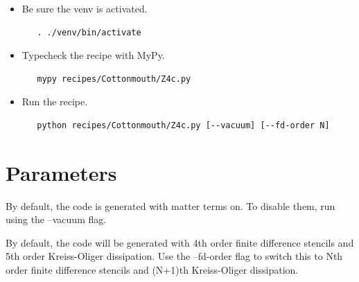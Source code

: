 \documentclass{article}
\begin{document}
\begin{itemize}
\item Be sure the venv is activated.
   \begin{verbatim}
   . ./venv/bin/activate
   \end{verbatim}

\item Typecheck the recipe with MyPy.
   \begin{verbatim}
   mypy recipes/Cottonmouth/Z4c.py
   \end{verbatim}

\item Run the recipe.
   \begin{verbatim}
   python recipes/Cottonmouth/Z4c.py [--vacuum] [--fd-order N]
   \end{verbatim}
\end{itemize}

\section{Parameters}

By default, the code is generated with matter terms on. To disable them, run using the --vacuum flag.

By default, the code will be generated with 4th order finite difference stencils and 5th order Kreiss-Oliger dissipation. Use the --fd-order flag to switch this to Nth order finite difference stencils and (N+1)th Kreiss-Oliger dissipation.

\end{document}
